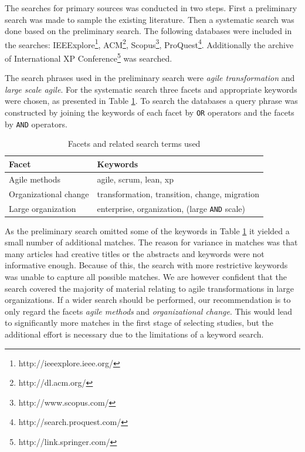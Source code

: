 \documentclass[lnbip]{svmultln}
\begin{document}

The searches for primary sources was conducted in two steps. First a preliminary
search was made to sample the existing literature. Then a systematic search was
done based on the preliminary search. The following databases were included in
the searches: IEEExplore\footnote{http://ieeexplore.ieee.org/},
ACM\footnote{http://dl.acm.org/}, Scopus\footnote{http://www.scopus.com/},
ProQuest\footnote{http://search.proquest.com/}.
Additionally the archive of International XP
Conference\footnote{http://link.springer.com/} was searched.

The search phrases used in the preliminary search were \textit{agile
transformation} and \textit{large scale agile}. For the systematic search three
facets and appropriate keywords were chosen, as presented in Table
\ref{table:searchterms}. To search the databases a query phrase was constructed
by joining the keywords of each facet by \texttt{OR} operators and the facets by
\texttt{AND} operators.

\begin{table}
    \begin{tabular}{ l@{ \hskip 0.4cm } l }
        \toprule
        Facet                  & Keywords   \\ \midrule
        Agile methods          & agile, scrum, lean, xp \\ 
        Organizational change  & transformation, transition, change, migration \\
        Large organization     & enterprise, organization, (large \texttt{AND} scale) \\
        \bottomrule
    \end{tabular}
    \caption{Facets and related search terms used}
    \label{table:searchterms}
\end{table}

As the preliminary search omitted some of the keywords in Table
\ref{table:searchterms} it yielded a small number of additional matches. The
reason for variance in matches was that many articles had creative titles or the
abstracts and keywords were not informative enough. Because of this, the search
with more restrictive keywords was unable to capture all possible matches.
We are however confident that the search covered the majority of material
relating to agile transformations in large organizations. If a wider search
should be performed, our recommendation is to only regard the facets
\textit{agile methods} and \textit{organizational change}. This would lead to
significantly more matches in the first stage of selecting studies, but the
additional effort is necessary due to the limitations of a keyword search.
\end{document}
